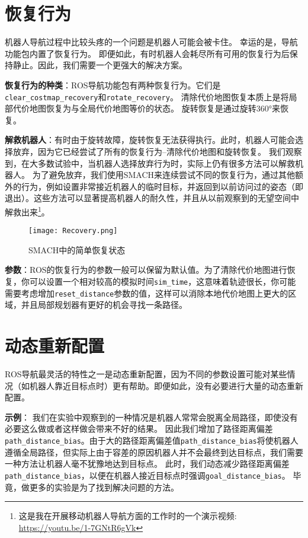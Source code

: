 \section[Recovery Behaviors]{恢复行为}%

机器人导航过程中比较头疼的一个问题是机器人可能会被卡住。 幸运的是，导航功能包内置了恢复行为。 
即便如此，有时机器人会耗尽所有可用的恢复行为后保持静止。因此，我们需要一个更强大的解决方案。

\textbf{恢复行为的种类}：ROS导航功能包有两种恢复行为。它们是\texttt{clear_costmap_recovery}和\texttt{rotate_recovery}。
清除代价地图恢复本质上是将局部代价地图恢复为与全局代价地图等价的状态。
旋转恢复是通过旋转360°来恢复。

\textbf{解救机器人}：有时由于旋转故障，旋转恢复无法获得执行。此时，机器人可能会选择放弃，因为它已经尝试了所有的恢复行为--清除代价地图和旋转恢复。
我们观察到，在大多数试验中，当机器人选择放弃行为时，实际上仍有很多方法可以解救机器人。
为了避免放弃，我们使用SMACH来连续尝试不同的恢复行为，通过其他额外的行为，例如设置非常接近机器人的临时目标，并返回到以前访问过的姿态（即退出）。这些方法可以显著提高机器人的耐久性，并且从以前观察到的无望空间中解救出来\footnote{这是我在开展移动机器人导航方面的工作时的一个演示视频: \url{https://youtu.be/1-7GNtR6gVk}}。

\begin{figure}[!h]
	\begin{center}
		\texttt{[image: Recovery.png]} 
		\caption{SMACH中的简单恢复状态}
	\end{center}
\end{figure}

\textbf{参数}：ROS的恢复行为的参数一般可以保留为默认值。为了清除代价地图进行恢复，你可以设置一个相对较高的模拟时间\texttt{sim_time}，这意味着轨迹很长，你可能需要考虑增加\texttt{reset_distance}参数的值，这样可以消除本地代价地图上更大的区域，并且局部规划器有更好的机会寻找一条路径。

\section[Dynamic Reconfigure]{动态重新配置}%

ROS导航最灵活的特性之一是动态重新配置，因为不同的参数设置可能对某些情况（如机器人靠近目标点时）更有帮助。即便如此，没有必要进行大量的动态重新配置。

\textbf{示例}：
我们在实验中观察到的一种情况是机器人常常会脱离全局路径，即使没有必要这么做或者这样做会带来不好的结果。
因此我们增加了路径距离偏差\texttt{path_distance_bias}。由于大的路径距离偏差值\texttt{path_distance_bias}将使机器人遵循全局路径，但实际上由于容差的原因机器人并不会最终到达目标点，我们需要一种方法让机器人毫不犹豫地达到目标点。
此时，我们动态减少路径距离偏差\texttt{path_distance_bias}，以便在机器人接近目标点时强调\texttt{goal_distance_bias}。
毕竟，做更多的实验是为了找到解决问题的方法。

